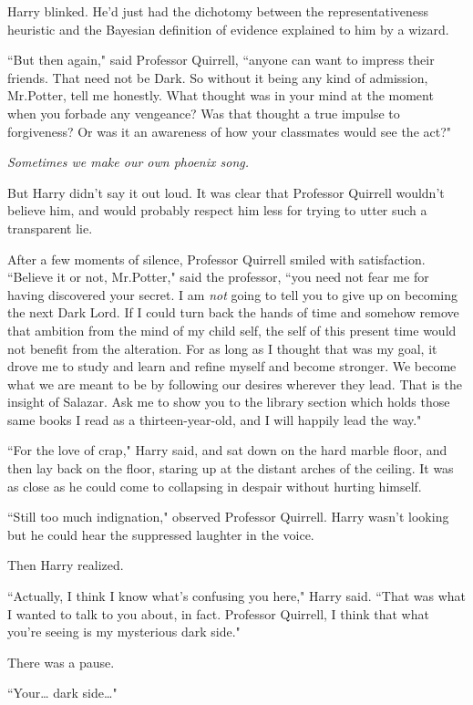 Harry blinked. He'd just had the dichotomy between the representativeness heuristic and the Bayesian definition of evidence explained to him by a wizard.

``But then again," said Professor Quirrell, ``anyone can want to impress their friends. That need not be Dark. So without it being any kind of admission, Mr.\?Potter, tell me honestly. What thought was in your mind at the moment when you forbade any vengeance? Was that thought a true impulse to forgiveness? Or was it an awareness of how your classmates would see the act?"

\emph{Sometimes we make our own phoenix song.}

But Harry didn't say it out loud. It was clear that Professor Quirrell wouldn't believe him, and would probably respect him less for trying to utter such a transparent lie.

After a few moments of silence, Professor Quirrell smiled with satisfaction. ``Believe it or not, Mr.\?Potter," said the professor, ``you need not fear me for having discovered your secret. I am \emph{not} going to tell you to give up on becoming the next Dark Lord. If I could turn back the hands of time and somehow remove that ambition from the mind of my child self, the self of this present time would not benefit from the alteration. For as long as I thought that was my goal, it drove me to study and learn and refine myself and become stronger. We become what we are meant to be by following our desires wherever they lead. That is the insight of Salazar. Ask me to show you to the library section which holds those same books I read as a thirteen-year-old, and I will happily lead the way."

``For the love of crap," Harry said, and sat down on the hard marble floor, and then lay back on the floor, staring up at the distant arches of the ceiling. It was as close as he could come to collapsing in despair without hurting himself.

``Still too much indignation," observed Professor Quirrell. Harry wasn't looking but he could hear the suppressed laughter in the voice.

Then Harry realized.

``Actually, I think I know what's confusing you here," Harry said. ``That was what I wanted to talk to you about, in fact. Professor Quirrell, I think that what you're seeing is my mysterious dark side."

There was a pause.

``Your{\ldots} dark side{\ldots}"

